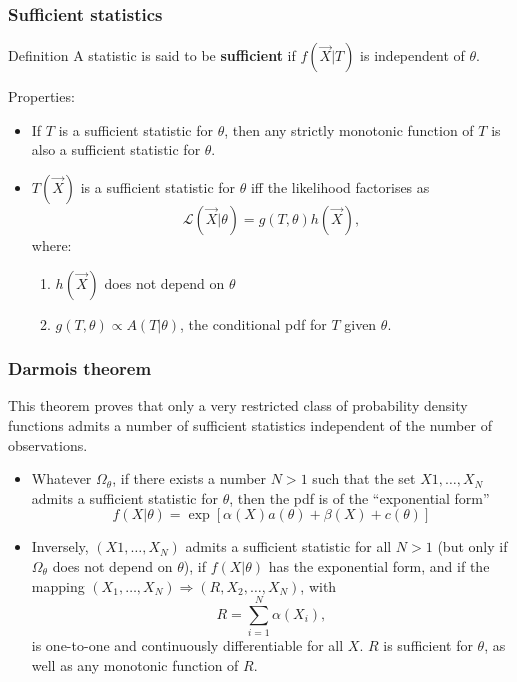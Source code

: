 \documentclass[9pt]{beamer}
\begin{document}
\begin{frame}
 \frametitle{Sufficient statistics}
 
 \begin{block}{Definition}
  A statistic is said to be \textbf{sufficient} if $f(\vec{X}|T)$ is independent of $\theta$.
 \end{block}
 
 Properties:
 
 \begin{itemize}
  \item If $T$ is a sufficient statistic for $\theta$, then any strictly monotonic function of $T$ is also a sufficient statistic for $\theta$.
  \item $T(\vec{X})$ is a sufficient statistic for $\theta$ iff the likelihood factorises as
  $$\mathcal{L}(\vec{X}|\theta) = g(T,\theta) h(\vec{X}),$$
  where:
  \begin{enumerate}
   \item $h(\vec{X})$ does not depend on $\theta$
   \item $g(T,\theta) \propto A(T|\theta)$, the conditional pdf for $T$ given $\theta$.
  \end{enumerate}
 \end{itemize}


\end{frame}

\begin{frame}
 \frametitle{Darmois theorem}
 
 This theorem proves that only a very restricted class of probability density functions admits a number of sufficient statistics independent of the number of observations.
 
 \begin{itemize}
  \item Whatever $\Omega_\theta$, if there exists a number $N>1$ such that the set $X1,\dots,X_N$ admits a sufficient statistic for $\theta$, then the pdf is of the ``exponential form''
  $$f(X|\theta) = \exp [ \alpha(X)a(\theta) + \beta(X) + c(\theta)]$$
  \item Inversely, $(X1,\dots,X_N)$ admits a sufficient statistic for all $N>1$ (but only if $\Omega_\theta$ does not depend on $\theta$), if $f(X|\theta)$ has the exponential form,
  and if the mapping $(X_1,\dots,X_N) \Rightarrow (R,X_2,\dots,X_N)$, with
  $$R = \sum_{i=1}^N \alpha(X_i),$$
  is one-to-one and continuously differentiable for all $X$. $R$ is sufficient for $\theta$, as well as any monotonic function of $R$.
 \end{itemize}

\end{frame}
\end{document}
